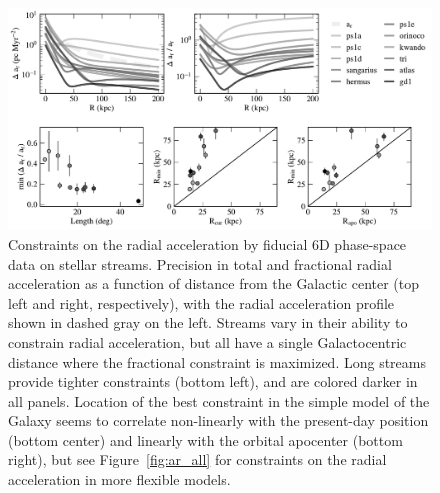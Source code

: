 \documentclass[modern]{aastex62}
\begin{document}
\begin{figure}
\begin{center}
\includegraphics[width=\textwidth]{ar_crb.pdf}
\caption{Constraints on the radial acceleration by fiducial 6D phase-space data on stellar streams.
Precision in total and fractional radial acceleration as a function of distance from the Galactic center (top left and right, respectively), with the radial acceleration profile shown in dashed gray on the left.
Streams vary in their ability to constrain radial acceleration, but all have a single Galactocentric distance where the fractional constraint is maximized.
Long streams provide tighter constraints (bottom left), and are colored darker in all panels.
Location of the best constraint in the simple model of the Galaxy seems to correlate non-linearly with the present-day position (bottom center) and linearly with the orbital apocenter (bottom right), but see Figure~\ref{fig:ar_all} for constraints on the radial acceleration in more flexible models.
}
\label{fig:ar}
\end{center}
\end{figure}
\end{document}
